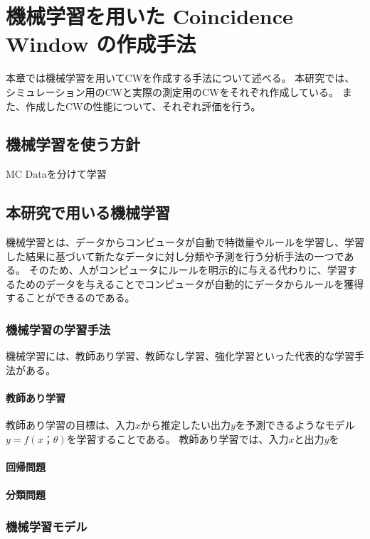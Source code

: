 \chapter{機械学習を用いた Coincidence Window の作成手法}
本章では機械学習を用いてCWを作成する手法について述べる。
本研究では、シミュレーション用のCWと実際の測定用のCWをそれぞれ作成している。
また、作成したCWの性能について、それぞれ評価を行う。

\section{機械学習を使う方針}
MC Dataを分けて学習\\


\section{本研究で用いる機械学習}
機械学習とは、データからコンピュータが自動で特徴量やルールを学習し、学習した結果に基づいて新たなデータに対し分類や予測を行う分析手法の一つである。
そのため、人がコンピュータにルールを明示的に与える代わりに、学習するためのデータを与えることでコンピュータが自動的にデータからルールを獲得することができるのである。

\subsection{機械学習の学習手法}
機械学習には、教師あり学習、教師なし学習、強化学習といった代表的な学習手法がある。

\subsubsection{教師あり学習}
教師あり学習の目標は、入力$x$から推定したい出力$y$を予測できるようなモデル$y = f(x；\theta)$を学習することである。
教師あり学習では、入力$x$と出力$y$を

\subsubsection{回帰問題}

\subsubsection{分類問題}

\subsection{機械学習モデル}

